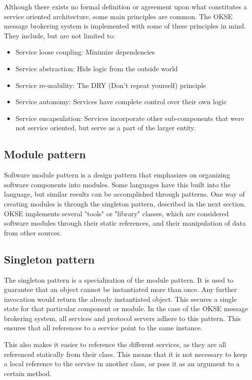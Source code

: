 Although there exists no formal definition or agreement upon what constitutes a service oriented architecture, some main principles are common. The OKSE message brokering system is implemented with some of these principles in mind. They include, but are not limited to:

\begin{itemize}
\item Service loose coupling: Minimize dependencies
\item Service abstraction: Hide logic from the outside world
\item Service re-usability: The DRY (Don't repeat yourself) principle
\item Service autonomy: Services have complete control over their own logic
\item Service encapsulation: Services incorporate other sub-components that were not service oriented, but serve as a part of the larger entity.
\end{itemize}

\subsection{Module pattern}

Software module pattern is a design pattern that emphasizes on organizing software components into modules. Some languages have this built into the language, but similar results can be accomplished through patterns. One way of creating modules is through the singleton pattern, described in the next section. OKSE implements several "tools" or "library" classes, which are considered software modules through their static references, and their manipulation of data from other sources.

\subsection{Singleton pattern}

The singleton pattern is a specialization of the module pattern. It is used to guarantee that an object cannot be instantiated more than once. Any further invocation would return the already instantiated object. This secures a single state for that particular component or module. In the case of the OKSE message brokering system, all services and protocol servers adhere to this pattern. This ensures that all references to a service point to the same instance.

This also makes it easier to reference the different services, as they are all referenced statically from their class. This means that it is not necessary to keep a local reference to the service in another class, or pass it as an argument to a certain method.


